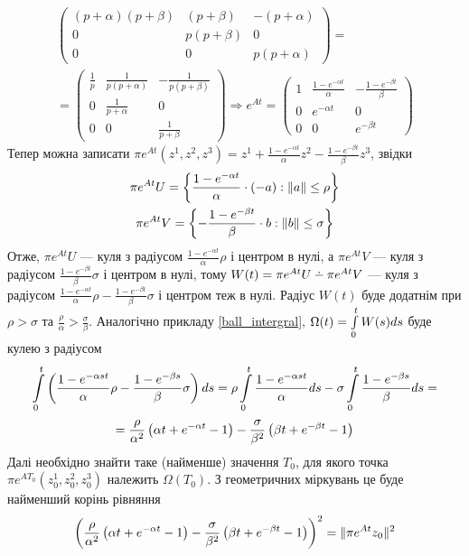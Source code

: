 \begin{example}
\begin{gather*}
\begin{pmatrix}
            (p+\alpha)(p+\beta) & (p+\beta) & -(p+\alpha) \\
            0 & p(p+\beta) & 0 \\
            0 & 0 & p(p+\alpha)
        \end{pmatrix} = \\ =
        \begin{pmatrix}
            \frac{1}{p} & \frac{1}{p(p+\alpha)} & - \frac{1}{p(p+\beta)} \\
            0 & \frac{1}{p+\alpha} & 0 \\
            0 & 0 & \frac{1}{p+\beta}
        \end{pmatrix} \Rightarrow
        e^{At} = \begin{pmatrix}
            1 & \frac{1 - e^{-\alpha t}}{\alpha} & -\frac{1 - e^{-\beta t}}{\beta} \\
            0 & e^{-\alpha t} & 0 \\
            0 & 0 & e^{-\beta t}
        \end{pmatrix}
    \end{gather*}
    Тепер можна записати $\pi e^{At}(z^1, z^2, z^3) = z^1 + \frac{1 - e^{-\alpha t}}{\alpha} z^2 - \frac{1 - e^{-\beta t}}{\beta}z^3$, звідки
    \begin{gather*}
        \pi e^{At} U = \left\{\frac{1 - e^{-\alpha t}}{\alpha} \cdot (-a) : \Vert a \Vert \leq \rho\right\} \\ 
        \pi e^{At} V = \left\{-\frac{1 - e^{-\beta t}}{\beta} \cdot b : \Vert b \Vert \leq \sigma\right\}
    \end{gather*}
    Отже, $\pi e^{At} U$ --- куля з радіусом $\frac{1 - e^{-\alpha t}}{\alpha}\rho$ і центром в нулі,
    а $\pi e^{At} V$ --- куля з радіусом $\frac{1 - e^{-\beta t}}{\beta}\sigma$ і центром в нулі, тому
    $W(t) = \pi e^{At}U \setdif \pi e^{At}V$ --- куля з радіусом 
    $\frac{1 - e^{-\alpha t}}{\alpha}\rho - \frac{1 - e^{-\beta t}}{\beta}\sigma$ і центром теж в нулі.
    Радіус $W(t)$ буде додатнім при $\rho > \sigma$ та $\frac{\rho}{\alpha} > \frac{\sigma}{\beta}$.
    Аналогічно прикладу \ref{ball_intergral}, $\Omega(t) = \int\limits_0^t W(s) ds$ буде кулею
    з радіусом
    \begin{gather*}
        \int\limits_0^t \left(\frac{1 - e^{-\alpha st}}{\alpha}\rho - \frac{1 - e^{-\beta s}}{\beta} \sigma\right) ds = 
        \rho \int\limits_0^t \frac{1 - e^{-\alpha st}}{\alpha} ds - \sigma \int\limits_0^t \frac{1 - e^{-\beta s}}{\beta} ds =
    \end{gather*}
    \begin{gather*}
        = \frac{\rho}{\alpha^2}\left(\alpha t + e^{-\alpha t} - 1\right) - 
        \frac{\sigma}{\beta^2}\left(\beta t + e^{-\beta t} - 1\right)
    \end{gather*}
    Далі необхідно знайти таке (найменше) значення $T_0$, для якого точка $\pi e^{A T_0}(z^1_0, z^2_0, z^3_0)$ належить
    $\Omega(T_0)$. З геометричних міркувань це буде найменший корінь рівняння
    \begin{gather*}
        \left( \frac{\rho}{\alpha^2}\left(\alpha t + e^{-\alpha t} - 1\right) - 
        \frac{\sigma}{\beta^2}\left(\beta t + e^{-\beta t} - 1\right)\right)^2 = \Vert \pi e^{A t} z_0 \Vert^2
    \end{gather*}
    

\end{example}
